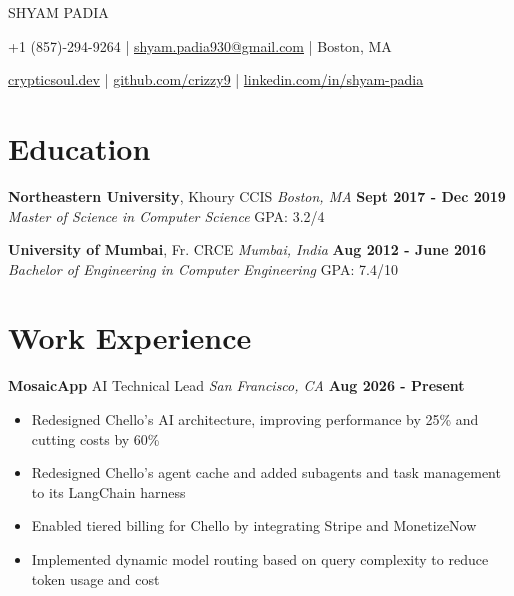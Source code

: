 \documentclass[10pt, letterpaper]{article}
\newcommand{\name}[1]{\centerline{\Large \scshape {#1}}}
\newcommand{\contactinfo}[1]{\centerline{\small #1}}
\newcommand{\educationentry}[4]{
  \noindent\textbf{#1}, #2 \hfill \textit{#3} \hfill \textbf{#4}
}
\newcommand{\jobentry}[4]{
  \noindent\textbf{#1} \hfill #2 \hfill \textit{#3} \hfill \textbf{#4}
}
\begin{document}
\name{SHYAM PADIA}
\contactinfo{
	+1 (857)-294-9264 |
	\href{mailto:shyam.padia930@gmail.com}{shyam.padia930@gmail.com} |
	Boston, MA
}
\contactinfo{
	\href{https://crypticsoul.dev}{crypticsoul.dev} |
	\href{https://github.com/crizzy9}{github.com/crizzy9} |
	\href{https://linkedin.com/in/shyam-padia}{linkedin.com/in/shyam-padia}
}

\section{Education}

\educationentry{Northeastern University}{Khoury CCIS}{Boston, MA}{Sept 2017 - Dec 2019}\\
\textit{Master of Science in Computer Science} \hfill GPA: 3.2/4


\educationentry{University of Mumbai}{Fr. CRCE}{Mumbai, India}{Aug 2012 - June 2016}\\
\textit{Bachelor of Engineering in Computer Engineering} \hfill GPA: 7.4/10

\section{Work Experience}

\jobentry{MosaicApp}{AI Technical Lead}{San Francisco, CA}{Aug 2026 - Present}
\begin{itemize}
	\item Redesigned Chello's AI architecture, improving performance by 25\% and cutting costs by 60\%
	\item Redesigned Chello's agent cache and added subagents and task management to its LangChain harness
	\item Enabled tiered billing for Chello by integrating Stripe and MonetizeNow
	\item Implemented dynamic model routing based on query complexity to reduce token usage and cost
\end{itemize}
\end{document}
